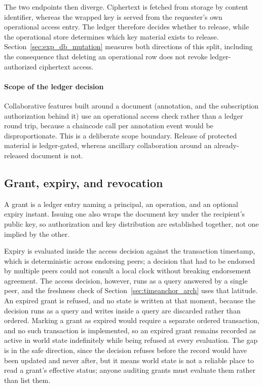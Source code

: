 \documentclass[preprint,12pt]{elsarticle}
\begin{document}
The two endpoints then diverge. Ciphertext is fetched from storage by
content identifier, whereas the wrapped key is served from the requester's own
operational access entry. The ledger therefore decides whether to release,
while the operational store determines which key material exists to release.
Section~\ref{sec:exp_db_mutation} measures both directions of this split,
including the consequence that deleting an operational row does not revoke
ledger-authorized ciphertext access.

\paragraph{Scope of the ledger decision}
Collaborative features built around a document (annotation, and the
subscription authorization behind it) use an operational access check rather
than a ledger round trip, because a chaincode call per annotation event would be
disproportionate. This is a deliberate scope boundary. Release of protected
material is ledger-gated, whereas ancillary collaboration around an
already-released document is not.

\subsection{Grant, expiry, and revocation}
\label{sec:grants}

A grant is a ledger entry naming a principal, an operation, and an optional
expiry instant. Issuing one also wraps the document key under the recipient's
public key, so authorization and key distribution are established together,
not one implied by the other.

Expiry is evaluated inside the access decision against the transaction
timestamp, which is deterministic across endorsing peers; a decision that
had to be endorsed by multiple peers could not consult a local clock without
breaking endorsement agreement. The access decision, however, runs as a query
answered by a single peer, and the freshness check of
Section~\ref{sec:timeanchor_arch} uses that latitude. An expired grant is
refused, and no state is written at that moment, because
the decision runs as a query and writes inside a query are discarded rather
than ordered. Marking a grant as expired would require a separate ordered
transaction, and no such transaction is implemented, so an expired grant
remains recorded as active in world state indefinitely while being refused at
every evaluation. The gap is in the safe direction, since the decision refuses
before the record would have been updated and never after, but it means world
state is not a reliable place to read a grant's effective status; anyone
auditing grants must evaluate them rather than list them.
\end{document}
